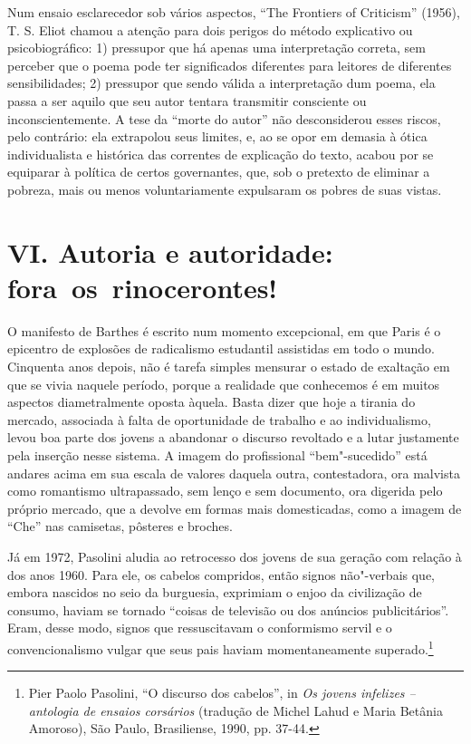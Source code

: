 Num ensaio esclarecedor sob vários aspectos, ``The Frontiers of
Criticism'' (1956), T. S. Eliot chamou a atenção para dois perigos do
método explicativo ou psicobiográfico: 1) pressupor que há apenas uma
interpretação correta, sem perceber que o poema pode ter significados
diferentes para leitores de diferentes sensibilidades; 2) pressupor que
sendo válida a interpretação dum poema, ela passa a ser aquilo que seu
autor tentara transmitir consciente ou inconscientemente. A tese da
``morte do autor'' não desconsiderou esses riscos, pelo contrário: ela
extrapolou seus limites, e, ao se opor em demasia à ótica individualista
e histórica das correntes de explicação do texto, acabou por se
equiparar à política de certos governantes, que, sob o pretexto de
eliminar a pobreza, mais ou menos voluntariamente expulsaram os pobres
de suas vistas.

\section*{VI. Autoria e autoridade: fora~os~rinocerontes!}

O manifesto de Barthes é escrito num momento excepcional, em que Paris é
o epicentro de explosões de radicalismo estudantil assistidas em todo o
mundo. Cinquenta anos depois, não é tarefa simples mensurar o estado de
exaltação em que se vivia naquele período, porque a realidade que
conhecemos é em muitos aspectos diametralmente oposta àquela. Basta
dizer que hoje a tirania do mercado, associada à falta de oportunidade
de trabalho e ao individualismo, levou boa parte dos jovens a abandonar
o discurso revoltado e a lutar justamente pela inserção nesse sistema. A
imagem do profissional ``bem"-sucedido'' está andares acima em sua escala
de valores daquela outra, contestadora, ora malvista como romantismo
ultrapassado, sem lenço e sem documento, ora digerida pelo próprio
mercado, que a devolve em formas mais domesticadas, como a imagem de
``Che'' nas camisetas, pôsteres e broches.

Já em 1972, Pasolini aludia ao retrocesso dos jovens de sua geração com
relação à dos anos 1960. Para ele, os cabelos compridos, então signos
não"-verbais que, embora nascidos no seio da burguesia, exprimiam o enjoo
da civilização de consumo, haviam se tornado ``coisas de televisão ou
dos anúncios publicitários''. Eram, desse modo, signos que ressuscitavam
o conformismo servil e o convencionalismo vulgar que seus pais haviam
momentaneamente superado.\footnote{Pier Paolo Pasolini, ``O discurso dos
  cabelos'', in \emph{Os jovens infelizes -- antologia de ensaios
  corsários} (tradução de Michel Lahud e Maria Betânia Amoroso), São
  Paulo, Brasiliense, 1990, pp. 37-44.}

